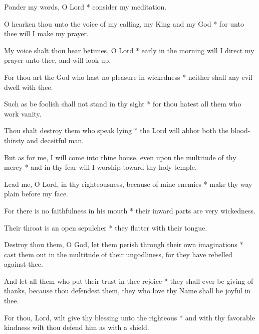 Ponder my words, O Lord * consider my meditation.

O hearken thou unto the voice of my calling, my King and my God * for unto thee will I make my prayer.

My voice shalt thou hear betimes, O Lord * early in the morning will I direct my prayer unto thee, and will look up.

For thou art the God who hast no pleasure in wickedness * neither shall any evil dwell with thee.

Such as be foolish shall not stand in thy sight * for thou hatest all them who work vanity.

Thou shalt destroy them who speak lying * the Lord will abhor both the blood-thirsty and deceitful man.

But as for me, I will come into thine house, even upon the multitude of thy mercy * and in thy fear will I worship toward thy holy temple.

Lead me, O Lord, in thy righteousness, because of mine enemies * make thy way plain before my face.

For there is no faithfulness in his mouth * their inward parts are very wickedness.

Their throat is an open sepulcher * they flatter with their tongue.

Destroy thou them, O God, let them perish through their own imaginations * cast them out in the multitude of their ungodliness, for they have rebelled against thee.

And let all them who put their trust in thee rejoice * they shall ever be giving of thanks, because thou defendest them, they who love thy Name shall be joyful in thee.

For thou, Lord, wilt give thy blessing unto the righteous * and with thy favorable kindness wilt thou defend him as with a shield.
